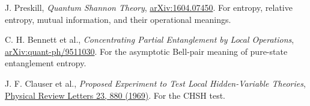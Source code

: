\documentclass[11pt,a4paper]{article}
\begin{document}
J. Preskill, \emph{Quantum Shannon Theory}, \href{https://arxiv.org/abs/1604.07450}{arXiv:1604.07450}. For entropy, relative entropy, mutual information, and their operational meanings.

C. H. Bennett et al., \emph{Concentrating Partial Entanglement by Local Operations}, \href{https://arxiv.org/abs/quant-ph/9511030}{arXiv:quant-ph/9511030}. For the asymptotic Bell-pair meaning of pure-state entanglement entropy.

J. F. Clauser et al., \emph{Proposed Experiment to Test Local Hidden-Variable Theories}, \href{https://doi.org/10.1103/PhysRevLett.23.880}{Physical Review Letters 23, 880 (1969)}. For the CHSH test.
\endgroup
\label{docend}
\end{document}
